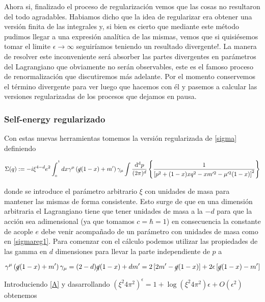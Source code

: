 \documentclass[tickz]{article}
\numberwithin{equation}{section}
\begin{document}
Ahora si, finalizado el proceso de regularización vemos que las cosas no resultaron del todo agradables. Habiamos dicho que la idea de regularizar era obtener una versión finita de las integrales y, si bien es cierto que mediante este método pudimos llegar a una expresión analítica de las mismas, vemos que si quisiésemos tomar el limite $ \epsilon \longrightarrow \infty $ seguiríamos teniendo un resultado divergente!. La manera de resolver este inconveniente será absorber las partes divergentes en parámetros del Lagrangiano que obviamente no serán observables, este es el famoso proceso de renormalización que discutiremos más adelante. Por el momento conservemos el término divergente para ver luego que hacemos con él y pasemos a calcular las versiones regularizadas de los procesos que dejamos en pausa. 

\subsubsection{Self-energy regularizado}

Con estas nuevas herramientas tomemos la versión regularizada de \ref{sigma} definiendo

\begin{equation}\label{sigmareg1}
\Sigma(q):=-i\xi^{4-d}e^{2}\int_{_{0}}^{^{1}}dx \gamma^{\mu}\left(\cancel{q}(1-x)+m'\right) \gamma_{\mu} \int\frac{\mathrm{d^d}p}{(2\pi)^d}\left\{\frac{1}{\left[p^{2}+(1-x)xq^{2}-xm'^{2}-\mu'^{2}(1-x)\right]^{2}}\right\}
\end{equation}

donde se introduce el parámetro arbitrario $ \xi $ con unidades de masa para mantener las mismas de forma consistente. Esto surge de que en una dimensión arbitraria el Lagrangiano tiene que tener unidades de masa a la $ -d $ para que la acción sea adimensional (ya que tomamos $ c=\hbar=1 $) en consecuencia la constante de acople $ e $ debe venir acompañado de un parámetro con unidades de masa como en \ref{sigmareg1}. Para comenzar con el cálculo podemos utilizar las propiedades de las gamma en $ d $ dimensiones para llevar la parte independiente de $ p $ a

\begin{equation}\label{A}
\gamma^{\mu}\left(\cancel{q}(1-x)+m'\right) \gamma_{\mu} = (2-d)\cancel{q}(1-x)+dm' = 2\left[2m' - \cancel{q}(1-x) \right] + 2\epsilon \left[ \cancel{q}(1-x) - m' \right]
\end{equation}

Introduciendo \ref{A} y dasarrollando $ \left(\xi^2 4 \pi^2\right)^\epsilon = 1 + \log\left(\xi^2 4 \pi^2\right) \epsilon + O(\epsilon^2)$ obtenemos
\end{document}
